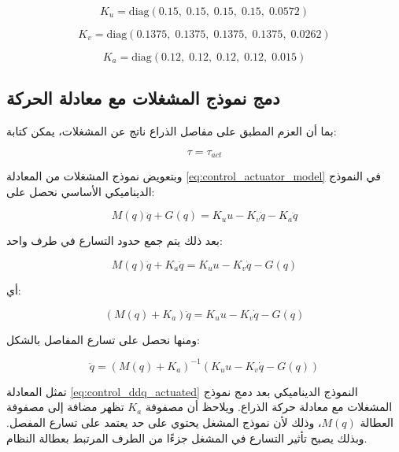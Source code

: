 \begin{equation}
K_u =
\mathrm{diag}
\left(
0.15,\;0.15,\;0.15,\;0.15,\;0.0572
\right)
\label{eq:control_ku_matrix}
\end{equation}

\begin{equation}
K_v =
\mathrm{diag}
\left(
0.1375,\;0.1375,\;0.1375,\;0.1375,\;0.0262
\right)
\label{eq:control_kv_matrix}
\end{equation}

\begin{equation}
K_a =
\mathrm{diag}
\left(
0.12,\;0.12,\;0.12,\;0.12,\;0.015
\right)
\label{eq:control_ka_matrix}
\end{equation}

\subsection{دمج نموذج المشغلات مع معادلة الحركة}

بما أن العزم المطبق على مفاصل الذراع ناتج عن المشغلات، يمكن كتابة:

\begin{equation}
\tau=\tau_{act}
\label{eq:control_tau_equals_tau_act}
\end{equation}

وبتعويض نموذج المشغلات من المعادلة \eqref{eq:control_actuator_model} في النموذج الديناميكي الأساسي نحصل على:

\begin{equation}
M(q)\ddot{q}+G(q)=K_u u-K_v\dot{q}-K_a\ddot{q}
\end{equation}

بعد ذلك يتم جمع حدود التسارع في طرف واحد:

\begin{equation}
M(q)\ddot{q}+K_a\ddot{q}
=
K_u u-K_v\dot{q}-G(q)
\end{equation}

أي:

\begin{equation}
\left(M(q)+K_a\right)\ddot{q}
=
K_u u-K_v\dot{q}-G(q)
\label{eq:control_merged_dynamic_model}
\end{equation}

ومنها نحصل على تسارع المفاصل بالشكل:

\begin{equation}
\ddot{q}
=
\left(M(q)+K_a\right)^{-1}
\left(
K_u u-K_v\dot{q}-G(q)
\right)
\label{eq:control_ddq_actuated}
\end{equation}

تمثل المعادلة \eqref{eq:control_ddq_actuated} النموذج الديناميكي بعد دمج نموذج المشغلات مع معادلة حركة الذراع. ويلاحظ أن مصفوفة \(K_a\) تظهر مضافة إلى مصفوفة العطالة \(M(q)\)، وذلك لأن نموذج المشغل يحتوي على حد يعتمد على تسارع المفصل. وبذلك يصبح تأثير التسارع في المشغل جزءًا من الطرف المرتبط بعطالة النظام.

